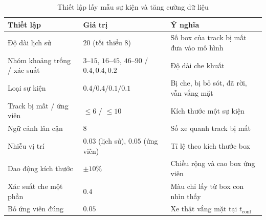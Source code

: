 \begin{table}[H]
    \centering
    \caption{Thiết lập lấy mẫu sự kiện và tăng cường dữ liệu}
    \label{tab:event_cfg}
    \begin{tabularx}{\textwidth}{l l X}
        \toprule
        \textbf{Thiết lập} & \textbf{Giá trị} & \textbf{Ý nghĩa} \\
        \midrule
        Độ dài lịch sử & $20$ (tối thiểu $8$) & Số box của track bị mất đưa vào mô hình \\
        Nhóm khoảng trống / xác suất & $3$--$15$, $16$--$45$, $46$--$90$ / $0.4, 0.4, 0.2$ & Độ dài che khuất \\
        Loại sự kiện & $0.4 / 0.4 / 0.1 / 0.1$ & Bị che, bị bỏ sót, đã rời, vẫn vắng mặt \\
        Track bị mất / ứng viên & $\le 6$ / $\le 10$ & Kích thước một sự kiện \\
        Ngữ cảnh lân cận & $8$ & Số xe quanh track bị mất \\
        Nhiễu vị trí & $0.03$ (lịch sử), $0.05$ (ứng viên) & Tỉ lệ theo kích thước box \\
        Dao động kích thước & $\pm 10\%$ & Chiều rộng và cao box ứng viên \\
        Xác suất che một phần & $0.4$ & Màu chỉ lấy từ box con nhìn thấy \\
        Bỏ ứng viên đúng & $0.05$ & Xe thật vắng mặt tại $t_{\text{conf}}$ \\
        \bottomrule
    \end{tabularx}
\end{table}

